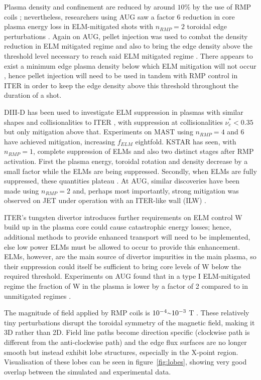 \documentclass[11pt, twocolumn]{article}  %
\providecommand{\squiggle}{\raise.17ex\hbox{$\scriptstyle\sim$}} %
\begin{document}
Plasma density and confinement are reduced by around $10\%$ by the use of RMP coils \cite{Lang2013}; nevertheless, researchers using AUG saw a factor 6 reduction in core plasma energy loss in ELM-mitigated shots with $n_{RMP}=2$ toroidal edge perturbations \cite{Suttrop2011}. Again on AUG, pellet injection was used to combat the density reduction in ELM mitigated regime and also to bring the edge density above the threshold level necessary to reach said ELM mitigated regime \cite{Lang2012}. There appears to exist a minimum edge plasma density below which ELM mitigation will not occur \cite{Suttrop2011}, hence pellet injection will need to be used in tandem with RMP control in ITER in order to keep the edge density above this threshold throughout the duration of a shot.

DIII-D has been used to investigate ELM suppression in plasmas with similar shapes and collisionalities to ITER \cite{Evans2008,Lanctot2013,Mordijck2011}, with suppression at collisionalities $\nu_c^* < 0.35$ but only mitigation above that. Experiments on MAST \cite{Kirk2013a} using $n_{RMP}=4 $ and $6$ have achieved mitigation, increasing $f_{ELM}$ eightfold. KSTAR has seen, with $n_{RMP}=1$, complete suppression of ELMs and also two distinct stages after RMP activation. First the plasma energy, toroidal rotation and density decrease by a small factor while the ELMs are being suppressed. Secondly, when ELMs are fully suppressed, these quantities plateau \cite{Kwak2013}. At AUG, similar discoveries have been made using $n_{RMP}=2$ \cite{Fischer2012,Suttrop2011} and, perhaps most importantly, strong mitigation was observed on JET under operation with an ITER-like wall (ILW) \cite{Liang2013}. 

ITER's tungsten divertor introduces further requirements on ELM control \cite{KirkFF} W build up in the plasma core could cause catastrophic energy losses; hence, additional methods to provide enhanced transport will need to be implemented, else low power ELMs must be allowed to occur to provide this enhancement. ELMs, however, are the main source of divertor impurities in the main plasma, so their suppression could itself be sufficient to bring core levels of W below the required threshold. Experiments on AUG found that in a type I ELM-mitigated regime the fraction of W in the plasma is lower by a factor of 2 compared to in unmitigated regimes \cite{Suttrop2011}.

The magnitude of field applied by RMP coils is $10^{-4} \squiggle 10^{-3}$ T \cite{Evans2015}. These relatively tiny perturbations disrupt the toroidal symmetry of the magnetic field, making it 3D rather than 2D. Field line paths become direction specific (clockwise path is different from the anti-clockwise path) and the edge flux surfaces are no longer smooth but instead exhibit lobe structures, especially in the X-point region. Visualisation of these lobes can be seen in figure~\ref{fig:lobes}, showing very good overlap between the simulated and experimental data.
\end{document}
